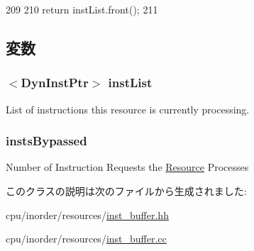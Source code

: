 \begin{DoxyCode}
209 {
210     return instList.front();
211 }
\end{DoxyCode}


\subsection{変数}
\hypertarget{classInstBuffer_ae10a391d02ce1ef67ee13cd82b7d46e5}{
\subsubsection[{instList}]{$<${\bf DynInstPtr}$>$ {\bf instList}}}
\label{classInstBuffer_ae10a391d02ce1ef67ee13cd82b7d46e5}
List of instructions this resource is currently processing. \hypertarget{classInstBuffer_af6881f44f674fa9f704b80ee1d0bdd17}{
\subsubsection[{instsBypassed}]{ {\bf instsBypassed}}}
\label{classInstBuffer_af6881f44f674fa9f704b80ee1d0bdd17}
Number of Instruction Requests the \hyperlink{classResource}{Resource} Processes 

このクラスの説明は次のファイルから生成されました:\begin{DoxyCompactItemize}
\item 
cpu/inorder/resources/\hyperlink{inst__buffer_8hh}{inst\_\-buffer.hh}\item 
cpu/inorder/resources/\hyperlink{inst__buffer_8cc}{inst\_\-buffer.cc}\end{DoxyCompactItemize}
